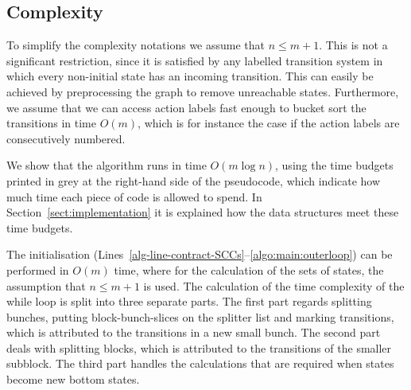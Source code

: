 \documentclass[a4paper,10pt]{article}
\theoremstyle{definition}
\theoremstyle{plain}
\newcommand{\bigo}[1]{{O\!\left(#1\right)}}
\newcommand{\remark}[1]{}
\newcommand{\dnj}[1]{\remark{\textcolor{red}{David: #1}}}
\begin{document}
\subsection{Complexity}\label{sec:complexity}


To simplify the complexity notations
we assume that $n \leq m + 1$. This is not a significant restriction,
since it is satisfied by any labelled transition system in which every non-initial state has an incoming transition.
This can easily be achieved by preprocessing the graph to remove unreachable states.
Furthermore, we assume that we can access action labels fast enough to bucket sort the transitions
in time $\bigo{m}$, which is for instance the case if the action labels are consecutively numbered.

We show that the algorithm runs in time $\bigo{m \log n}$,
using the time budgets
printed in grey at the right-hand side of the pseudocode,
which indicate how much time each piece of code is allowed to spend.
In Section~\ref{sect:implementation} it is explained how the data structures meet these time budgets.

The initialisation (Lines~\ref{alg-line-contract-SCCs}--\ref{algo:main:outerloop}) can be performed in $\bigo{m}$ time, where for the calculation of the sets of states, the assumption that $n \leq m+1$ is used.
The calculation of the time complexity of the while loop
is split into three separate parts. The first part regards splitting bunches, putting block-bunch-slices on the splitter list
and marking transitions,
which is attributed to the transitions in a new small bunch.
The second part deals with splitting blocks, which is attributed to the transitions of the smaller subblock.
The third
part handles the calculations that are required when states become new bottom states.
\end{document}
